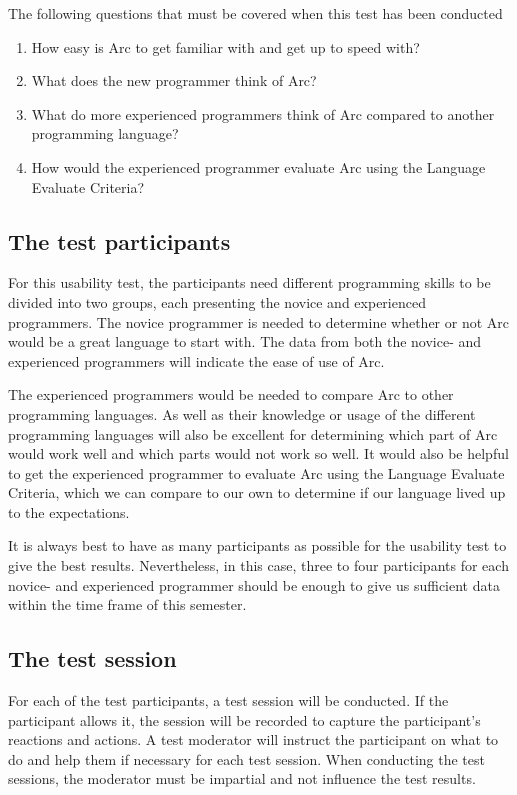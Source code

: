 The following questions that must be covered when this test has been conducted
\begin{enumerate}
    \item How easy is Arc to get familiar with and get up to speed with?
    \item What does the new programmer think of Arc?
    \item What do more experienced programmers think of Arc compared to another programming language?
    \item How would the experienced programmer evaluate Arc using the Language Evaluate Criteria?
\end{enumerate}

\subsection{The test participants}\label{subsubsec:theTestParticipants}
For this usability test, the participants need different programming skills to be divided into two groups, each presenting the novice and experienced programmers. The novice programmer is needed to determine whether or not Arc would be a great language to start with. The data from both the novice- and experienced programmers will indicate the ease of use of Arc.

The experienced programmers would be needed to compare Arc to other programming languages. As well as their knowledge or usage of the different programming languages will also be excellent for determining which part of Arc would work well and which parts would not work so well. It would also be helpful to get the experienced programmer to evaluate Arc using the Language Evaluate Criteria, which we can compare to our own to determine if our language lived up to the expectations.

It is always best to have as many participants as possible for the usability test to give the best results. Nevertheless, in this case, three to four participants for each novice- and experienced programmer should be enough to give us sufficient data within the time frame of this semester.

\subsection{The test session}\label{subsubsec:theTestSession}
For each of the test participants, a test session will be conducted. If the participant allows it, the session will be recorded to capture the participant's reactions and actions. A test moderator will instruct the participant on what to do and help them if necessary for each test session. When conducting the test sessions, the moderator must be impartial and not influence the test results.

